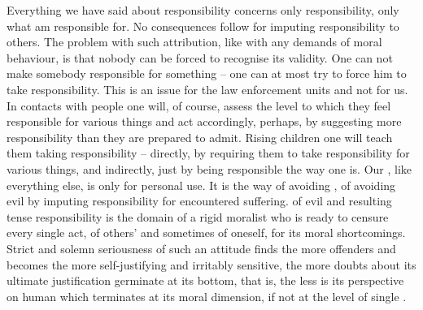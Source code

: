 \pa Everything we have said about responsibility concerns only 
responsibility, only what  am responsible for. No consequences follow for
imputing responsibility to others.  The problem with such attribution, like with
any demands of moral behaviour, is that nobody can be forced to recognise its
validity. One can not make somebody responsible for something -- one can at most
try to force him to take responsibility. This is an issue for the law
enforcement units and not for us. In contacts with people one will, of course,
assess the level to which they feel responsible for various things and act
accordingly, perhaps, by suggesting more responsibility than they are prepared
to admit. Rising children one will teach them taking responsibility -- directly,
by requiring them to  take responsibility for various things, and
indirectly, just by being responsible the way one is. Our , like everything else, is only for personal use.  It is the
way of avoiding , of avoiding  evil by
imputing responsibility for encountered suffering.  of evil
and resulting tense responsibility is the domain of a rigid moralist who is
ready to censure every single act, of others' and sometimes of oneself, for its moral
shortcomings.  Strict and solemn seriousness of such an attitude finds the more
offenders and becomes the more self-justifying and irritably sensitive, the more
doubts about its ultimate justification germinate at its bottom, that is, the
less  is its perspective on human  which
terminates at its moral dimension, if not at the level of single .

 


